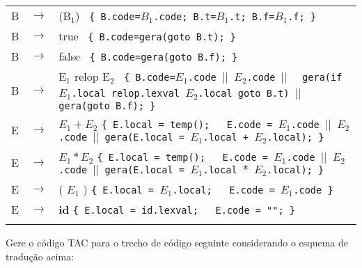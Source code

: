 \documentclass[11pt,portuguese,a4paper]{article}
\newcommand{\et}[1]{\texttt{#1}}
\begin{document}
\begin{tabularx}{\textwidth}{llX}
 B  &  $\rightarrow$  &  (B$_1$) \et{ \{ B.code=$B_1$.code; B.t=$B_1$.t; B.f=$B_1$.f; \} }                                \\\medskip


 B  &  $\rightarrow$  &  true \et{ \{ B.code=gera(goto B.t); \} }                                                         \\\medskip


 B  &  $\rightarrow$  &  false \et{ \{ B.code=gera(goto B.f); \} }                                                        \\\medskip


 B  &  $\rightarrow$  &  E$_1$ relop E$_2$ \et{ \{ B.code=$E_1$.code $\vert\vert$ $E_2$.code $\vert\vert$ }    \et{ gera(if $E_1$.local relop.lexval $E_2$.local goto B.t) $\vert\vert$ }  \et{ gera(goto B.f); \} }                                                                        \\\medskip



 E  &  $\rightarrow$  &  $E_1 + E_2$           \texttt{\small \{ E.local = temp();  \ \ E.code = $E_1$.code $\vert\vert$ $E_2$.code $\vert\vert$  gera(E.local = $E_1$.local + $E_2$.local); \}           }         \\\medskip
 E  &  $\rightarrow$  &  $E_1 * E_2$           \texttt{\small \{ E.local = temp();  \ \ E.code = $E_1$.code $\vert\vert$ $E_2$.code $\vert\vert$  gera(E.local = $E_1$.local $*$ $E_2$.local); \}           }       \\\medskip
 E  &  $\rightarrow$  &  ( $E_1$ )             \texttt{\small \{ E.local = $E_1$.local; \ \ E.code = $E_1$.code \} }                                      \\\medskip
 E  &  $\rightarrow$  &  \textbf{id}           \texttt{\small \{ E.local = id.lexval; \ \ E.code = ""; \} }                                               \\\medskip

\end{tabularx}

\vspace{-.5cm}

Gere o código TAC para o trecho de código seguinte considerando o esquema de tradução acima:
\end{document}
